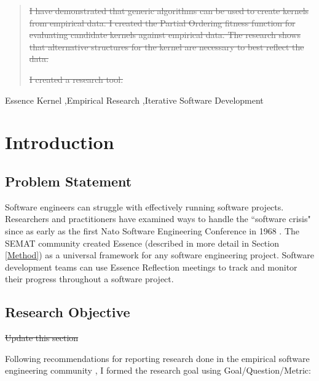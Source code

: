 \documentclass[preprint,12pt,3p]{elsarticle}
\begin{document}
\begin{frontmatter}
\begin{abstract}
\sout{I have demonstrated that generic algorithms can be used to create kernels from empirical data. I created the Partial Ordering fitness function for evaluating candidate kernels against empirical data. The research shows that alternative structures for the kernel are necessary to best reflect the data.}

\sout{I created a research tool.}
\end{abstract}

\begin{keyword}
Essence Kernel \sep Empirical Research \sep Iterative Software Development
\end{keyword}

\end{frontmatter}


\section{Introduction}

\subsection{Problem Statement}
Software engineers can struggle with effectively running software projects. Researchers and practitioners have examined ways to handle the ``software crisis" since as early as the first Nato Software Engineering Conference in 1968 \cite{Naur1969}. The SEMAT community created Essence (described in more detail in Section \ref{Method}) as a universal framework for any software engineering project.  Software development teams can use Essence Reflection meetings \cite{EASE2014} to track and monitor their progress throughout a software project. 

\subsection{Research Objective}
\sout{Update this section}

Following recommendations for reporting research done in the empirical
software engineering community
\cite{GQM, Shaw}, I formed the
research goal using Goal/Question/Metric:
\cite{GQM}
\end{document}
